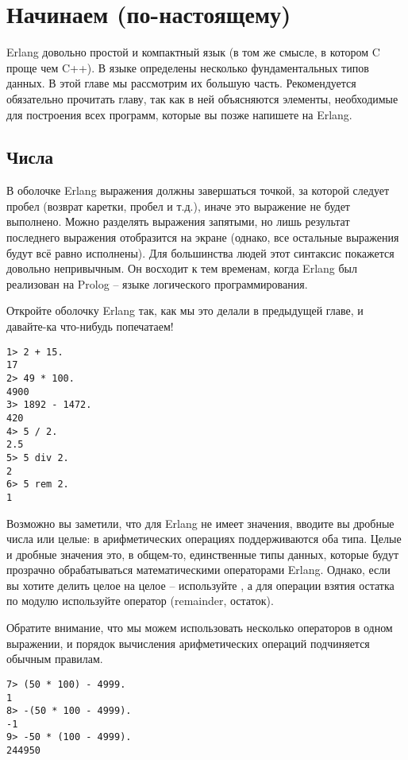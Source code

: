 \chapter{Начинаем (по\--настоящему)}
\label{starting-out-for-real}
\setlength{\parindent}{0cm}
\colorbox{lgray}
{
    \begin{minipage}{\linewidth}
    Erlang довольно простой и компактный язык (в том же смысле, в котором C проще чем C++).
    В языке определены несколько фундаментальных типов данных.
    В этой главе мы рассмотрим их большую часть.
    Рекомендуется обязательно прочитать главу, так как в ней объясняются элементы, необходимые для построения всех программ, которые вы позже напишете на Erlang.
    \end{minipage}
}
\setlength{\parindent}{1cm}
\section{Числа}
\label{numbers}
В оболочке Erlang выражения должны завершаться точкой, за которой следует пробел (возврат каретки, пробел и т.д.), иначе это выражение не будет выполнено.
Можно разделять выражения запятыми, но лишь результат последнего выражения отобразится на экране (однако, все остальные выражения будут всё равно исполнены).
Для большинства людей этот синтаксис покажется довольно непривычным.
Он восходит к тем временам, когда Erlang был реализован на Prolog \--- языке логического программирования.

Откройте оболочку Erlang так, как мы это делали в предыдущей главе, и давайте\--ка что\--нибудь попечатаем!
\begin{lstlisting}[style=repl]
1> 2 + 15.
17
2> 49 * 100.
4900
3> 1892 - 1472.
420
4> 5 / 2.
2.5
5> 5 div 2.
2
6> 5 rem 2.
1
\end{lstlisting}

Возможно вы заметили, что для Erlang не имеет значения, вводите вы дробные числа или целые: в арифметических операциях поддерживаются оба типа.
Целые и дробные значения это, в общем\--то, единственные типы данных, которые будут прозрачно обрабатываться математическими операторами Erlang.
Однако, если вы хотите делить целое на целое \--- используйте , а для операции взятия остатка по модулю используйте оператор (remainder, остаток).

Обратите внимание, что мы можем использовать несколько операторов в одном выражении, и порядок вычисления арифметических операций подчиняется обычным правилам.
\begin{lstlisting}[style=repl]
7> (50 * 100) - 4999.
1
8> -(50 * 100 - 4999).
-1
9> -50 * (100 - 4999).
244950
\end{lstlisting}

